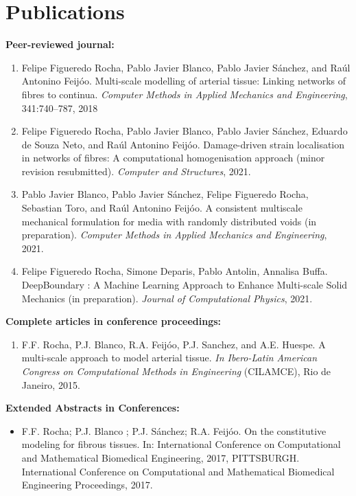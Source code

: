 \documentclass[letterpaper]{twentysecondcv} %
\begin{document}
\section{Publications}
\item \textbf{Peer-reviewed journal:}
\begin{enumerate}
\item Felipe Figueredo Rocha, Pablo Javier Blanco, Pablo Javier Sánchez, and Raúl Antonino Feijóo. Multi-scale modelling of arterial tissue: Linking networks of fibres to continua. \textit{Computer Methods in Applied Mechanics and Engineering}, 341:740–787, 2018
\item Felipe Figueredo Rocha, Pablo Javier Blanco, Pablo Javier Sánchez, Eduardo de Souza Neto, and Raúl Antonino Feijóo. Damage-driven strain localisation in networks of fibres: A computational homogenisation approach (minor revision resubmitted). \textit{Computer and Structures}, 2021.
\item Pablo Javier Blanco, Pablo Javier Sánchez, Felipe Figueredo Rocha, Sebastian Toro, and Raúl Antonino Feijóo. A consistent multiscale mechanical formulation for media with randomly distributed voids (in preparation). \textit{Computer Methods in Applied Mechanics and Engineering}, 2021.
\item Felipe Figueredo Rocha, Simone Deparis, Pablo Antolin, Annalisa Buffa. DeepBoundary : A Machine Learning Approach to Enhance Multi-scale  Solid Mechanics (in preparation). \textit{Journal of Computational Physics}, 2021.

\end{enumerate}	
\vskip -0.1cm
\item \textbf{Complete articles in conference proceedings:} 
\begin{enumerate}
	\item F.F. Rocha, P.J. Blanco, R.A. Feijóo, P.J. Sanchez, and A.E. Huespe. A multi-scale approach to model arterial tissue. \textit{In Ibero-Latin American Congress on Computational Methods in Engineering} (CILAMCE), Rio
	de Janeiro, 2015.
\end{enumerate}	
\vskip -0.1cm
\item \textbf{Extended Abstracts in Conferences:}
\begin{itemize}
\item F.F. Rocha; P.J. Blanco ; P.J. Sánchez; R.A. Feijóo. On the constitutive modeling for fibrous tissues. In: International Conference on Computational and Mathematical Biomedical Engineering, 2017, PITTSBURGH. International Conference on Computational and Mathematical Biomedical Engineering Proceedings, 2017.
\end{itemize}
\end{document}
